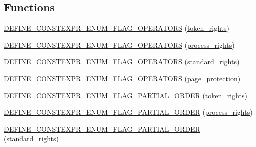 \subsection*{Functions}
\begin{DoxyCompactItemize}
\item 
\mbox{\hyperlink{namespacedistant_a82b047769466b9f5ea2d440e5453ce21}{D\+E\+F\+I\+N\+E\+\_\+\+C\+O\+N\+S\+T\+E\+X\+P\+R\+\_\+\+E\+N\+U\+M\+\_\+\+F\+L\+A\+G\+\_\+\+O\+P\+E\+R\+A\+T\+O\+RS}} (\mbox{\hyperlink{structdistant_1_1access__rights_a6b4d9e837868c8c15cf407e4c80d7f3c}{token\+\_\+rights}})
\item 
\mbox{\hyperlink{namespacedistant_a83ab6b342d31b05345e670023fca66a8}{D\+E\+F\+I\+N\+E\+\_\+\+C\+O\+N\+S\+T\+E\+X\+P\+R\+\_\+\+E\+N\+U\+M\+\_\+\+F\+L\+A\+G\+\_\+\+O\+P\+E\+R\+A\+T\+O\+RS}} (\mbox{\hyperlink{structdistant_1_1access__rights_ae153052a690584111c46ec7a78d1ef81}{process\+\_\+rights}})
\item 
\mbox{\hyperlink{namespacedistant_a3471fede06d16523e3c5745c52d85381}{D\+E\+F\+I\+N\+E\+\_\+\+C\+O\+N\+S\+T\+E\+X\+P\+R\+\_\+\+E\+N\+U\+M\+\_\+\+F\+L\+A\+G\+\_\+\+O\+P\+E\+R\+A\+T\+O\+RS}} (\mbox{\hyperlink{structdistant_1_1access__rights_a1aa121d7e246b51f7386f992adce1664}{standard\+\_\+rights}})
\item 
\mbox{\hyperlink{namespacedistant_a5578babfaeeea06d1bfb00d9a845b02b}{D\+E\+F\+I\+N\+E\+\_\+\+C\+O\+N\+S\+T\+E\+X\+P\+R\+\_\+\+E\+N\+U\+M\+\_\+\+F\+L\+A\+G\+\_\+\+O\+P\+E\+R\+A\+T\+O\+RS}} (\mbox{\hyperlink{structdistant_1_1access__rights_a09c6caea8f570f8e2d18c3ef2e2a7804}{page\+\_\+protection}})
\item 
\mbox{\hyperlink{namespacedistant_acf01a4e7c5971b8a11a3a95285b4606f}{D\+E\+F\+I\+N\+E\+\_\+\+C\+O\+N\+S\+T\+E\+X\+P\+R\+\_\+\+E\+N\+U\+M\+\_\+\+F\+L\+A\+G\+\_\+\+P\+A\+R\+T\+I\+A\+L\+\_\+\+O\+R\+D\+ER}} (\mbox{\hyperlink{structdistant_1_1access__rights_a6b4d9e837868c8c15cf407e4c80d7f3c}{token\+\_\+rights}})
\item 
\mbox{\hyperlink{namespacedistant_affe5b625c0cadbcf7dfee2ee7d2c3c6f}{D\+E\+F\+I\+N\+E\+\_\+\+C\+O\+N\+S\+T\+E\+X\+P\+R\+\_\+\+E\+N\+U\+M\+\_\+\+F\+L\+A\+G\+\_\+\+P\+A\+R\+T\+I\+A\+L\+\_\+\+O\+R\+D\+ER}} (\mbox{\hyperlink{structdistant_1_1access__rights_ae153052a690584111c46ec7a78d1ef81}{process\+\_\+rights}})
\item 
\mbox{\hyperlink{namespacedistant_ae901ac9900a1f0263ed3c16fd9ec0877}{D\+E\+F\+I\+N\+E\+\_\+\+C\+O\+N\+S\+T\+E\+X\+P\+R\+\_\+\+E\+N\+U\+M\+\_\+\+F\+L\+A\+G\+\_\+\+P\+A\+R\+T\+I\+A\+L\+\_\+\+O\+R\+D\+ER}} (\mbox{\hyperlink{structdistant_1_1access__rights_a1aa121d7e246b51f7386f992adce1664}{standard\+\_\+rights}})

\end{DoxyCompactItemize}
